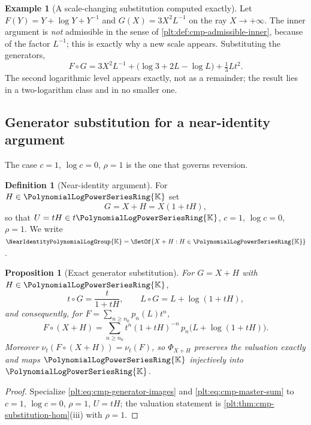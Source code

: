\documentclass[11pt,oneside]{article}
\theoremstyle{plain}
\newtheorem{proposition}[theorem]{Proposition}
\theoremstyle{definition}
\newtheorem{definition}[theorem]{Definition}
\newtheorem{example}[theorem]{Example}
\theoremstyle{remark}
\newcommand{\K}{\mathbb{K}}
\newcommand{\PLpow}{\PolynomialLogPowerSeriesRing{\K}}   %
\newcommand{\Gnear}{\NearIdentityPolynomialLogGroup{\K}} %
\newcommand{\ordt}{\nu_{t}}                              %
\newcommand{\compose}{\mathbin{\circ}}
\begin{document}
\begin{example}[A scale-changing substitution computed exactly]
\label{plt:ex:cmp-scale-change}
Let \(F(Y)=Y+\log Y+Y^{-1}\) and \(G(X)=3X^{2}L^{-1}\) on the ray
\(X\to+\infty\).  The inner argument is \emph{not} admissible in the sense of
\cref{plt:def:cmp-admissible-inner}, because of the factor \(L^{-1}\); this is
exactly why a new scale appears.  Substituting the generators,
\[
 F\compose G
 =3X^{2}L^{-1}+\bigl(\log3+2L-\log L\bigr)+\tfrac13Lt^{2}.
\]
The second logarithmic level appears exactly, not as a remainder; the result
lies in a two-logarithm class and in no smaller one.
\end{example}

\subsection{Generator substitution for a near-identity argument}
\label{plt:sec:cmp-generator-substitution}

The case \(c=1\), \(\log c=0\), \(\rho=1\) is the one that governs reversion.

\begin{definition}[Near-identity argument]\label{plt:def:cmp-near-identity}
For \(H\in\PLpow\) set
\[
 G=X+H=X(1+tH),
\]
so that \(U=tH\in t\PLpow\), \(c=1\), \(\log c=0\), \(\rho=1\).  We write
\(\Gnear=\SetOf{X+H:H\in\PLpow}\).
\end{definition}

\begin{proposition}[Exact generator substitution]
\label{plt:prop:cmp-generator-substitution}
For \(G=X+H\) with \(H\in\PLpow\),
\begin{equation}\label{plt:eq:cmp-generators-near-identity}
 t\compose G=\frac{t}{1+tH},
 \qquad
 L\compose G=L+\log(1+tH),
\end{equation}
and consequently, for \(F=\sum_{n\ge n_0}p_n(L)t^n\),
\begin{equation}\label{plt:eq:cmp-near-identity-master}
 F\compose(X+H)
 =\sum_{n\ge n_0}t^{n}(1+tH)^{-n}\,
   p_n\!\bigl(L+\log(1+tH)\bigr).
\end{equation}
Moreover \(\ordt(F\compose(X+H))=\ordt(F)\), so \(\Phi_{X+H}\) preserves the
valuation exactly and maps \(\PLpow\) injectively into \(\PLpow\).
\end{proposition}

\begin{proof}
Specialize \eqref{plt:eq:cmp-generator-images} and
\eqref{plt:eq:cmp-master-sum} to \(c=1\), \(\log c=0\), \(\rho=1\),
\(U=tH\); the valuation statement is
\cref{plt:thm:cmp-substitution-hom}(iii) with \(\rho=1\).
\end{proof}
\end{document}
